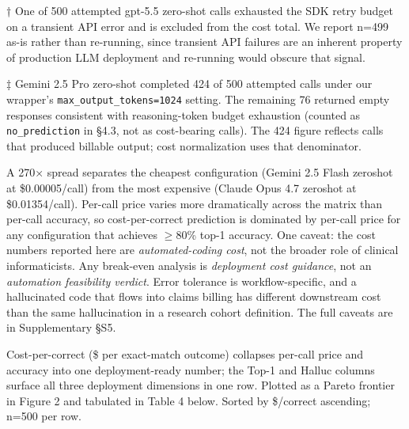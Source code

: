 † One of 500 attempted gpt-5.5 zero-shot calls exhausted the SDK
retry budget on a transient API error and is excluded from the cost
total. We report n=499 as-is rather than re-running, since transient
API failures are an inherent property of production LLM deployment
and re-running would obscure that signal.

‡ Gemini 2.5 Pro zero-shot completed 424 of 500 attempted calls
under our wrapper's \texttt{max\_output\_tokens=1024} setting. The remaining
76 returned empty responses consistent with reasoning-token budget
exhaustion (counted as \texttt{no\_prediction} in §4.3, not as cost-bearing
calls). The 424 figure reflects calls that produced billable
output; cost normalization uses that denominator.

A 270× spread separates the cheapest configuration (Gemini 2.5
Flash zeroshot at \$0.00005/call) from the most expensive (Claude
Opus 4.7 zeroshot at \$0.01354/call). Per-call price varies more
dramatically across the matrix than per-call accuracy, so
cost-per-correct prediction is dominated by per-call price for any
configuration that achieves $\geq$80\% top-1 accuracy. One caveat: the
cost numbers reported here are \emph{automated-coding cost}, not the
broader role of clinical informaticists. Any break-even analysis
is \emph{deployment cost guidance}, not an \emph{automation feasibility
verdict}. Error tolerance is workflow-specific, and a hallucinated
code that flows into claims billing has different downstream cost
than the same hallucination in a research cohort definition. The
full caveats are in Supplementary §S5.

Cost-per-correct (\$ per exact-match outcome) collapses per-call
price and accuracy into one deployment-ready number; the Top-1
and Halluc columns surface all three deployment dimensions in one
row. Plotted as a Pareto frontier in Figure 2 and tabulated in
Table 4 below. Sorted by \$/correct ascending; n=500 per row.

